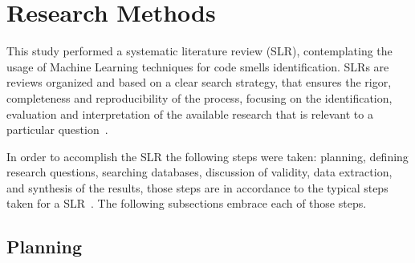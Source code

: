 \section{Research Methods}


This study performed a systematic literature review (SLR), contemplating the usage of Machine Learning techniques for code smells identification. SLRs are reviews organized and based on a clear search strategy, that ensures the rigor, completeness and reproducibility of the process, focusing on the identification, evaluation and interpretation of the available research that is relevant to a particular question~\citep{kitchenham2010systematic}.

In order to accomplish the SLR the following steps were taken: planning, defining research questions, searching databases, discussion of validity, data extraction, and synthesis of the results, those steps are in accordance to the typical steps taken for a SLR~\citep{keele2007guidelines}. The following subsections embrace each of those steps.

\subsection{Planning}

